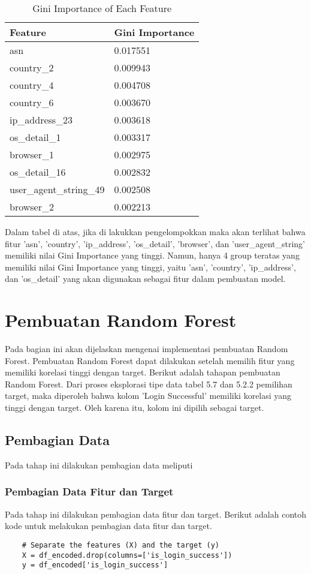     \begin{table}[H]
    \centering
    \begin{tabular}{|l|l|}
    \hline
    \textbf{Feature} & \textbf{Gini Importance} \\ \hline
    asn & 0.017551 \\ 
    country\_2 & 0.009943 \\ 
    country\_4 & 0.004708 \\ 
    country\_6 & 0.003670 \\ 
    ip\_address\_23 & 0.003618 \\ 
    os\_detail\_1 & 0.003317 \\ 
    browser\_1 & 0.002975 \\ 
    os\_detail\_16 & 0.002832 \\ 
    user\_agent\_string\_49 & 0.002508 \\ 
    browser\_2 & 0.002213 \\ \hline
    \end{tabular}
    \caption{Gini Importance of Each Feature}
    \label{tab:gini_importance}
    \end{table}

    Dalam tabel di atas, jika di lakukkan pengelompokkan maka akan terlihat bahwa fitur 'asn', 'country', 'ip\_address', 'os\_detail', 'browser', dan 'user\_agent\_string' memiliki nilai Gini Importance yang tinggi. 
    Namun, hanya 4 group teratas yang memiliki nilai Gini Importance yang tinggi, yaitu 'asn', 'country', 'ip\_address', dan 'os\_detail' yang akan digunakan sebagai fitur dalam pembuatan model.

\section{Pembuatan Random Forest}
Pada bagian ini akan dijelaskan mengenai implementasi pembuatan Random Forest. Pembuatan Random Forest dapat dilakukan setelah memilih fitur yang memiliki korelasi tinggi dengan target. Berikut adalah tahapan pembuatan Random Forest.
Dari proses eksplorasi tipe data tabel 5.7 dan 5.2.2 pemilihan target, maka diperoleh bahwa kolom 'Login Successful' memiliki korelasi yang tinggi dengan target. Oleh karena itu, kolom ini dipilih sebagai target.
\subsection{Pembagian Data}
Pada tahap ini dilakukan pembagian data meliputi

\subsubsection{Pembagian Data Fitur dan Target}
Pada tahap ini dilakukan pembagian data fitur dan target. Berikut adalah contoh kode untuk melakukan pembagian data fitur dan target.
\begin{lstlisting}
    # Separate the features (X) and the target (y)
    X = df_encoded.drop(columns=['is_login_success'])
    y = df_encoded['is_login_success']
    \end{lstlisting}

